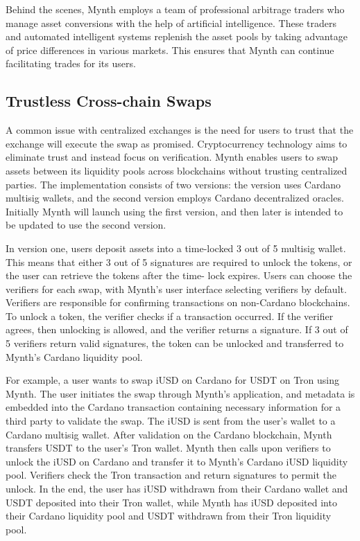 Behind the scenes, Mynth employs a team of professional arbitrage
traders who manage asset conversions with the help of artificial
intelligence. These traders and automated intelligent systems replenish
the asset pools by taking advantage of price differences in various
markets. This ensures that Mynth can continue facilitating trades for
its users.

\hypertarget{trustless-cross-chain-swaps}{%
\subsection{Trustless Cross-chain
Swaps}\label{trustless-cross-chain-swaps}}

A common issue with centralized exchanges is the need for users to trust
that the exchange will execute the swap as promised. Cryptocurrency
technology aims to eliminate trust and instead focus on veriﬁcation.
Mynth enables users to swap assets between its liquidity pools across
blockchains without trusting centralized parties. The implementation
consists of two versions: the version uses Cardano multisig wallets, and
the second version employs Cardano decentralized oracles. Initially
Mynth will launch using the ﬁrst version, and then later is intended to
be updated to use the second version.

In version one, users deposit assets into a time-locked 3 out of 5
multisig wallet. This means that either 3 out of 5 signatures are
required to unlock the tokens, or the user can retrieve the tokens after
the time- lock expires. Users can choose the veriﬁers for each swap,
with Mynth's user interface selecting veriﬁers by default. Veriﬁers are
responsible for conﬁrming transactions on non-Cardano blockchains. To
unlock a token, the veriﬁer checks if a transaction occurred. If the
veriﬁer agrees, then unlocking is allowed, and the veriﬁer returns a
signature. If 3 out of 5 veriﬁers return valid signatures, the token can
be unlocked and transferred to Mynth's Cardano liquidity pool.

For example, a user wants to swap iUSD on Cardano for USDT on Tron using
Mynth. The user initiates the swap through Mynth's application, and
metadata is embedded into the Cardano transaction containing necessary
information for a third party to validate the swap. The iUSD is sent
from the user's wallet to a Cardano multisig wallet. After validation on
the Cardano blockchain, Mynth transfers USDT to the user's Tron wallet.
Mynth then calls upon veriﬁers to unlock the iUSD on Cardano and
transfer it to Mynth's Cardano iUSD liquidity pool. Veriﬁers check the
Tron transaction and return signatures to permit the unlock. In the end,
the user has iUSD withdrawn from their Cardano wallet and USDT deposited
into their Tron wallet, while Mynth has iUSD deposited into their
Cardano liquidity pool and USDT withdrawn from their Tron liquidity
pool.

